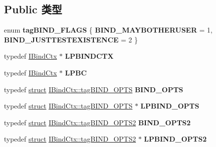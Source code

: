 \subsection*{Public 类型}
\begin{DoxyCompactItemize}
\item 
\mbox{\label{interface_i_bind_ctx_a6510380df8753989275c93ce9a413b7b}} 
enum {\bfseries tag\+B\+I\+N\+D\+\_\+\+F\+L\+A\+GS} \{ {\bfseries B\+I\+N\+D\+\_\+\+M\+A\+Y\+B\+O\+T\+H\+E\+R\+U\+S\+ER} = 1, 
{\bfseries B\+I\+N\+D\+\_\+\+J\+U\+S\+T\+T\+E\+S\+T\+E\+X\+I\+S\+T\+E\+N\+CE} = 2
 \}
\item 
\mbox{\label{interface_i_bind_ctx_aef8d69d8424114f17adf0cc778002b90}} 
typedef \hyperlink{interface_i_bind_ctx}{I\+Bind\+Ctx} $\ast$ {\bfseries L\+P\+B\+I\+N\+D\+C\+TX}
\item 
\mbox{\label{interface_i_bind_ctx_aaab9361d3424119fab5e6bf54b875592}} 
typedef \hyperlink{interface_i_bind_ctx}{I\+Bind\+Ctx} $\ast$ {\bfseries L\+P\+BC}
\item 
\mbox{\label{interface_i_bind_ctx_a8a7734f952c7835952b353c8f13e788e}} 
typedef \hyperlink{interfacestruct}{struct} \hyperlink{struct_i_bind_ctx_1_1tag_b_i_n_d___o_p_t_s}{I\+Bind\+Ctx\+::tag\+B\+I\+N\+D\+\_\+\+O\+P\+TS} {\bfseries B\+I\+N\+D\+\_\+\+O\+P\+TS}
\item 
\mbox{\label{interface_i_bind_ctx_a794da065be7d54254e8d3ce38e47df0c}} 
typedef \hyperlink{interfacestruct}{struct} \hyperlink{struct_i_bind_ctx_1_1tag_b_i_n_d___o_p_t_s}{I\+Bind\+Ctx\+::tag\+B\+I\+N\+D\+\_\+\+O\+P\+TS} $\ast$ {\bfseries L\+P\+B\+I\+N\+D\+\_\+\+O\+P\+TS}
\item 
\mbox{\label{interface_i_bind_ctx_abe295ee22282944b8904e719593753e5}} 
typedef \hyperlink{interfacestruct}{struct} \hyperlink{struct_i_bind_ctx_1_1tag_b_i_n_d___o_p_t_s2}{I\+Bind\+Ctx\+::tag\+B\+I\+N\+D\+\_\+\+O\+P\+T\+S2} {\bfseries B\+I\+N\+D\+\_\+\+O\+P\+T\+S2}
\item 
\mbox{\label{interface_i_bind_ctx_a774a2dfe3c75ae1cfc104bdc77964545}} 
typedef \hyperlink{interfacestruct}{struct} \hyperlink{struct_i_bind_ctx_1_1tag_b_i_n_d___o_p_t_s2}{I\+Bind\+Ctx\+::tag\+B\+I\+N\+D\+\_\+\+O\+P\+T\+S2} $\ast$ {\bfseries L\+P\+B\+I\+N\+D\+\_\+\+O\+P\+T\+S2}

\end{DoxyCompactItemize}
